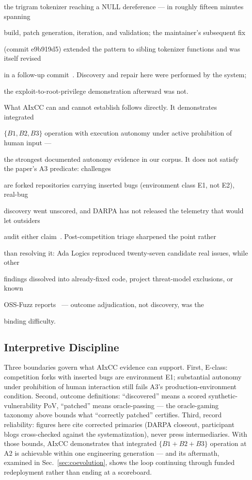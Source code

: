 \documentclass[conference,compsoc]{IEEEtran}
\begin{document}
the trigram tokenizer reaching a NULL dereference --- in roughly fifteen minutes spanning

build, patch generation, iteration, and validation; the maintainer's subsequent fix

(commit e9b919d5) extended the pattern to sibling tokenizer functions and was itself revised

in a follow-up commit~\cite{taasc2024}. Discovery and repair here were performed by the system;

the exploit-to-root-privilege demonstration afterward was not.

What AIxCC can and cannot establish follows directly. It demonstrates integrated

$\{B1,B2,B3\}$ operation with execution autonomy under active prohibition of human input ---

the strongest documented autonomy evidence in our corpus. It does not satisfy the paper's A3
predicate: challenges

are forked repositories carrying inserted bugs (environment class E1, not E2), real-bug

discovery went unscored, and DARPA has not released the telemetry that would let outsiders

audit either claim~\cite{tobbuttercup2025}. Post-competition triage sharpened the point rather

than resolving it: Ada Logics reproduced twenty-seven candidate real issues, while other

findings dissolved into already-fixed code, project threat-model exclusions, or known

OSS-Fuzz reports~\cite{openssfaixcc2026} --- outcome adjudication, not discovery, was the

binding difficulty.

\subsection{Interpretive Discipline}
Three boundaries govern what AIxCC evidence can support. First, E-class: competition forks with
inserted bugs are environment E1; substantial autonomy under prohibition of human interaction
still fails A3's production-environment condition. Second, outcome definitions: ``discovered''
means a scored synthetic-vulnerability PoV, ``patched'' means oracle-passing --- the oracle-gaming
taxonomy above bounds what ``correctly patched'' certifies. Third, record reliability: figures
here cite corrected primaries (DARPA closeout, participant blogs cross-checked against the
systematization), never press intermediaries. With those bounds, AIxCC demonstrates that
integrated $\{B1{+}B2{+}B3\}$ operation at A2 is achievable within one engineering generation
--- and its aftermath, examined in Sec.~\ref{sec:coevolution}, shows the loop continuing
through funded redeployment rather than ending at a scoreboard.
\end{document}
